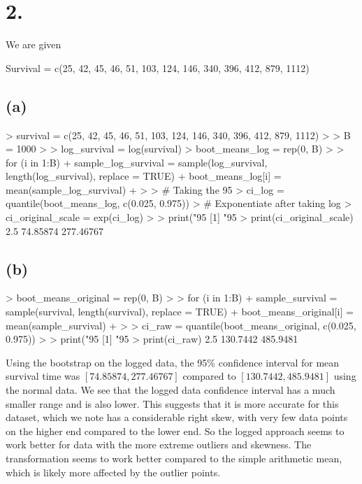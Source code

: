 \documentclass{article}
\begin{document}
{\Large 

\section*{2.}

We are given 
\begin{spverbatim}
Survival = c(25, 42, 45, 46, 51, 103, 124, 146, 340, 396, 412, 879, 1112)
\end{spverbatim}

\subsection*{(a)} 

\begin{spverbatim}
> survival = c(25, 42, 45, 46, 51, 103, 124, 146, 340, 396, 412, 879, 1112)
> 
> B = 1000
> 
> log_survival = log(survival)
> boot_means_log = rep(0, B)
> 
> for (i in 1:B) {
+   sample_log_survival = sample(log_survival, length(log_survival), replace = TRUE)
+   boot_means_log[i] = mean(sample_log_survival)
+ }
> 
> # Taking the 95%
> ci_log = quantile(boot_means_log, c(0.025, 0.975))
> # Exponentiate after taking log
> ci_original_scale = exp(ci_log)
> 
> print("95%
[1] "95%
> print(ci_original_scale)
     2.5%
 74.85874 277.46767 
\end{spverbatim}

\subsection*{(b)}

\begin{spverbatim}
> boot_means_original = rep(0, B)
> 
> for (i in 1:B) {
+   sample_survival = sample(survival, length(survival), replace = TRUE)
+   boot_means_original[i] = mean(sample_survival)
+ }
> 
> ci_raw = quantile(boot_means_original, c(0.025, 0.975))
> 
> print("95%
[1] "95%
> print(ci_raw)
    2.5%
130.7442 485.9481 
\end{spverbatim}

Using the bootstrap on the logged data, the 95\% confidence interval for mean survival time was \([74.85874, 277.46767]\) compared to \([130.7442, 485.9481]\) using the normal data. We see that the logged data confidence interval has a much smaller range and is also lower. This suggests that it is more accurate for this dataset, which we note has a considerable right skew, with very few data points on the higher end compared to the lower end. So the logged approach seems to work better for data with the more extreme outliers and skewness. The transformation seems to work better compared to the simple arithmetic mean, which is likely more affected by the outlier points.

}
\end{document}
